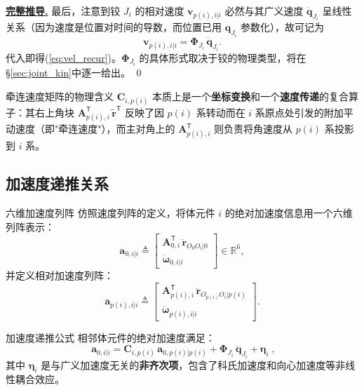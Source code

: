 \documentclass[10pt,a4paper]{book}
\theoremstyle{thmstyle}
\theoremstyle{defstyle}
\theoremstyle{prostyle}
\renewenvironment{proof}[1][证明]{\par{\kaishu \underline{\textbf{#1.}}} \;\fangsong}{\qed\par}
\newcommand{\T}{^{\mathsf{T}}}
\renewcommand{\vec}[1]{\bm{#1}}
\newcommand{\mat}[1]{\bm{#1}}
\newcommand{\tildev}[1]{\tilde{#1}}
\newcommand{\R}{\mathbb{R}}
\begin{document}
\begin{proof}[完整推导]
  最后，注意到铰 $J_i$ 的相对速度 $\vec{v}_{p(i),i|i}$ 必然与其广义速度 $\dot{\vec{q}}_{J_i}$ 呈线性关系（因为速度是位置对时间的导数，而位置已用 $\vec{q}_{J_i}$ 参数化），故可记为
  \[
  \vec{v}_{p(i),i|i} = \mat{\Phi}_{J_i}\,\dot{\vec{q}}_{J_i}.
  \]
  代入即得(\ref{eq:vel_recur})。$\mat{\Phi}_{J_i}$ 的具体形式取决于铰的物理类型，将在\S\ref{sec:joint_kin}中逐一给出。
\end{proof}

\begin{mydefinition}{牵连速度矩阵的物理含义}
$\mat{C}_{i,p(i)}$ 本质上是一个\textbf{坐标变换}和一个\textbf{速度传递}的复合算子：其右上角块 $\mat{A}_{p(i),i}\T\,\tildev{\vec{r}}\T$ 反映了因 $p(i)$ 系转动而在 $i$ 系原点处引发的附加平动速度（即"牵连速度"），而主对角上的 $\mat{A}_{p(i),i}\T$ 则负责将角速度从 $p(i)$ 系投影到 $i$ 系。
\end{mydefinition}

\subsection{加速度递推关系}

\begin{mydefinition}{六维加速度列阵}
仿照速度列阵的定义，将体元件 $i$ 的绝对加速度信息用一个六维列阵表示：
\begin{equation}
\vec{a}_{0,i|i} \triangleq
\begin{bmatrix}
\mat{A}_{0,i}\T\,\ddot{\vec{r}}_{O_0O_i|0} \\
\dot{\vec{\omega}}_{0,i|i}
\end{bmatrix}\in\R^6,
\label{eq:six_dim_acc}
\end{equation}
并定义相对加速度列阵：
\begin{equation}
\vec{a}_{p(i),i|i} \triangleq
\begin{bmatrix}
\mat{A}_{p(i),i}\T\,\ddot{\vec{r}}_{O_{p(i)}O_i|p(i)} \\
\dot{\vec{\omega}}_{p(i),i|i}
\end{bmatrix}.
\label{eq:rel_acc}
\end{equation}
\end{mydefinition}

\begin{myTheorem}{加速度递推公式}
相邻体元件的绝对加速度满足：
\begin{equation}
\boxed{\;\vec{a}_{0,i|i} = \mat{C}_{i,p(i)}\,\vec{a}_{0,p(i)|p(i)} + \mat{\Phi}_{J_i}\,\ddot{\vec{q}}_{J_i} + \vec{\eta}_i\;},
\label{eq:acc_recur}
\end{equation}
其中 $\vec{\eta}_i$ 是与广义加速度无关的\textbf{非齐次项}，包含了科氏加速度和向心加速度等非线性耦合效应。
\end{myTheorem}
\end{document}
